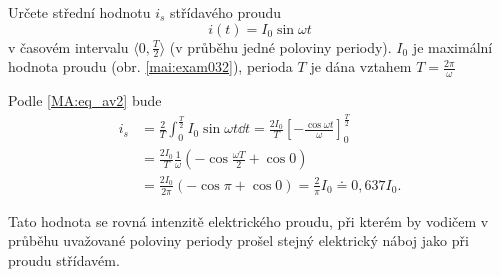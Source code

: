 \begin{mdframed}[style=mdexam]
  \begin{example}\label{mai:exam032}
    Určete střední hodnotu $i_s$ střídavého proudu $$i(t) = I_0\sin\omega t$$ v časovém intervalu
    $\langle 0, \frac{T}{2}\rangle$ (v průběhu jedné poloviny periody). $I_0$ je maximální hodnota
    proudu (obr. \ref{mai:exam032}), perioda $T$ je dána vztahem $T = \frac{2\pi}{\omega}$
    
    {\centering
    \captionsetup{type=figure}
    \par}

      Podle \ref{MA:eq_av2} bude
      \begin{align*}
      i_s &=  \frac{2}{T}
              \int_0^{\frac{T}{2}}I_0\sin\omega t\dd{t} =
              \frac{2I_0}{T}\left[-\frac{\cos\omega t}{\omega}\right]_0^{\frac{T}{2}}        \\
          &=  \frac{2I_0}{T}\frac{1}{\omega}\left(-\cos\frac{\omega T}{2}+ \cos 0\right)     \\
          &=  \frac{2I_0}{2\pi}(-\cos\pi + \cos 0) = \frac{2}{\pi}I_0 \doteq 0,637 I_0.
    \end{align*}

    Tato hodnota se rovná intenzitě elektrického proudu, při kterém by vodičem v průběhu uvažované
    poloviny periody prošel stejný elektrický náboj jako při proudu střídavém.
  \end{example}
\end{mdframed}















